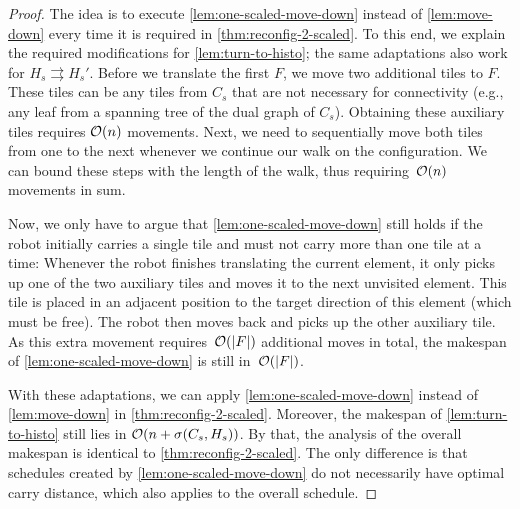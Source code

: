 \begin{proof}
	The idea is to execute \cref{lem:one-scaled-move-down} instead of \cref{lem:move-down} every time it is required in \cref{thm:reconfig-2-scaled}.
	To this end, we explain the required modifications for \cref{lem:turn-to-histo}; the same adaptations also work for $H_s \rightrightarrows H_s'$.
	Before we translate the first \comp{} $F$, we move two additional tiles to $F$.
	These tiles can be any tiles from $C_s$ that are not necessary for connectivity (e.g., any leaf from a spanning tree of the dual graph of $C_s$).
	Obtaining these auxiliary tiles requires $\mathcal{O}(n)$ movements.
	Next, we need to sequentially move both tiles from one \comp{} to the next whenever we continue our walk on the configuration.
	We can bound these steps with the length of the walk, thus requiring~$\mathcal{O}(n)$ movements in sum.

	Now, we only have to argue that \cref{lem:one-scaled-move-down} still holds if the robot initially carries a single tile and must not carry more than one tile at a time:
	Whenever the robot finishes translating the current element, it only picks up one of the two auxiliary tiles and moves it to the next unvisited element.
	This tile is placed in an adjacent position to the target direction of this element (which must be free).
	The robot then moves back and picks up the other auxiliary tile.
	As this extra movement requires~$\mathcal{O}(|F|)$ additional moves in total, the makespan of \cref{lem:one-scaled-move-down} is still in~$\mathcal{O}(|F|)$.

	With these adaptations, we can apply \cref{lem:one-scaled-move-down} instead of \cref{lem:move-down} in \cref{thm:reconfig-2-scaled}.
	Moreover, the makespan of \cref{lem:turn-to-histo} still lies in $\mathcal{O}(n + \sigma(C_s,H_s))$.
	By that, the analysis of the overall makespan is identical to \cref{thm:reconfig-2-scaled}.
	The only difference is that schedules created by \cref{lem:one-scaled-move-down} do not necessarily have optimal carry distance, which also applies to the overall schedule.
\end{proof}
